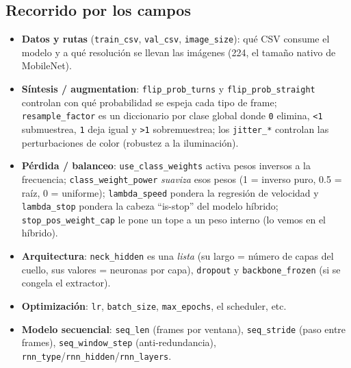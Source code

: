 \documentclass[11pt,a4paper]{article}
\newcommand{\code}[1]{\lstinline[basicstyle=\ttfamily\normalsize]|#1|}
\begin{document}


\subsection*{Recorrido por los campos}
\begin{itemize}
  \item \textbf{Datos y rutas} (\code{train_csv}, \code{val_csv}, \code{image_size}): qué CSV consume el
  modelo y a qué resolución se llevan las imágenes (224, el tamaño nativo de MobileNet).
  \item \textbf{Síntesis / augmentation}: \code{flip_prob_turns} y \code{flip_prob_straight} controlan con qué
  probabilidad se espeja cada tipo de frame; \code{resample_factor} es un diccionario por clase global donde
  \code{0} elimina, \code{<1} submuestrea, \code{1} deja igual y \code{>1} sobremuestrea; los \code{jitter_*}
  controlan las perturbaciones de color (robustez a la iluminación).
  \item \textbf{Pérdida / balanceo}: \code{use_class_weights} activa pesos inversos a la frecuencia;
  \code{class_weight_power} \emph{suaviza} esos pesos (1 = inverso puro, 0.5 = raíz, 0 = uniforme);
  \code{lambda_speed} pondera la regresión de velocidad y \code{lambda_stop} pondera la cabeza ``is-stop''
  del modelo híbrido; \code{stop_pos_weight_cap} le pone un tope a un peso interno (lo vemos en el híbrido).
  \item \textbf{Arquitectura}: \code{neck_hidden} es una \emph{lista} (su largo = número de capas del cuello,
  sus valores = neuronas por capa), \code{dropout} y \code{backbone_frozen} (si se congela el extractor).
  \item \textbf{Optimización}: \code{lr}, \code{batch_size}, \code{max_epochs}, el scheduler, etc.
  \item \textbf{Modelo secuencial}: \code{seq_len} (frames por ventana), \code{seq_stride} (paso entre frames),
  \code{seq_window_step} (anti-redundancia), \code{rnn_type}/\code{rnn_hidden}/\code{rnn_layers}.
\end{itemize}
\end{document}
